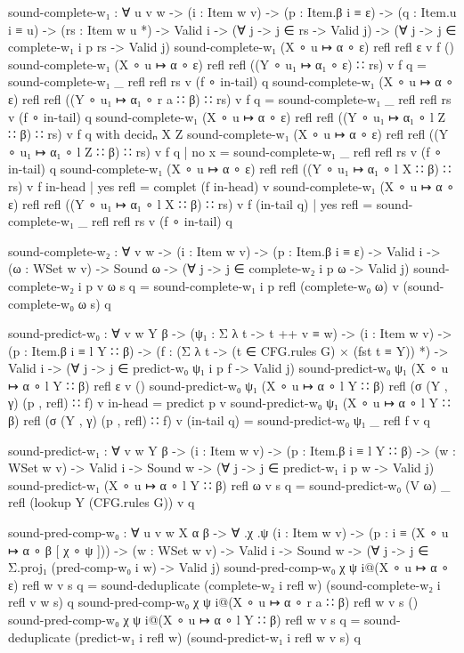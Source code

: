 \begin{code}
			sound-complete-w₁ : ∀ {u v w} ->
			  (i : Item w v) ->
			  (p : Item.β i ≡ ε) ->
			  (q : Item.u i ≡ u) ->
			  (rs : Item w u *) ->
			  Valid i -> (∀ {j} -> j ∈ rs -> Valid j) ->
			  (∀ {j} -> j ∈ complete-w₁ i p rs -> Valid j)
			sound-complete-w₁ (X ∘ u ↦ α ∘ ε) refl refl ε v f ()
			sound-complete-w₁ (X ∘ u ↦ α ∘ ε) refl refl ((Y ∘ u₁ ↦ α₁ ∘ ε) ∷ rs) v f q = sound-complete-w₁ _ refl refl rs v (f ∘ in-tail) q
			sound-complete-w₁ (X ∘ u ↦ α ∘ ε) refl refl ((Y ∘ u₁ ↦ α₁ ∘ r a ∷ β) ∷ rs) v f q = sound-complete-w₁ _ refl refl rs v (f ∘ in-tail) q
			sound-complete-w₁ (X ∘ u ↦ α ∘ ε) refl refl ((Y ∘ u₁ ↦ α₁ ∘ l Z ∷ β) ∷ rs) v f q           with decidₙ X Z
			sound-complete-w₁ (X ∘ u ↦ α ∘ ε) refl refl ((Y ∘ u₁ ↦ α₁ ∘ l Z ∷ β) ∷ rs) v f q           | no x = sound-complete-w₁ _ refl refl rs v (f ∘ in-tail) q
			sound-complete-w₁ (X ∘ u ↦ α ∘ ε) refl refl ((Y ∘ u₁ ↦ α₁ ∘ l X ∷ β) ∷ rs) v f in-head     | yes refl = complet (f in-head) v
			sound-complete-w₁ (X ∘ u ↦ α ∘ ε) refl refl ((Y ∘ u₁ ↦ α₁ ∘ l X ∷ β) ∷ rs) v f (in-tail q) | yes refl = sound-complete-w₁ _ refl refl rs v (f ∘ in-tail) q
			
			sound-complete-w₂ : ∀ {v w} ->
			  (i : Item w v) ->
			  (p : Item.β i ≡ ε) ->
			  Valid i -> (ω : WSet w v) -> Sound ω ->
			  (∀ {j} -> j ∈ complete-w₂ i p ω -> Valid j)
			sound-complete-w₂ i p v ω s q =
			  sound-complete-w₁ i p refl (complete-w₀ ω) v (sound-complete-w₀ ω s) q
			
			sound-predict-w₀ : ∀ {v w  Y β} ->
			  (ψ₁ : Σ λ t -> t ++ v ≡ w) ->
			  (i : Item w v) -> (p : Item.β i ≡ l Y ∷ β) ->
			  (f : (Σ λ t -> (t ∈ CFG.rules G) × (fst t ≡ Y)) *) ->
			  Valid i ->
			  (∀ {j} -> j ∈ predict-w₀ ψ₁ i p f -> Valid j)
			sound-predict-w₀ ψ₁ (X ∘ u ↦ α ∘ l Y ∷ β) refl ε v ()
			sound-predict-w₀ ψ₁ (X ∘ u ↦ α ∘ l Y ∷ β) refl (σ (Y , γ) (p , refl) ∷ f) v in-head = predict p v
			sound-predict-w₀ ψ₁ (X ∘ u ↦ α ∘ l Y ∷ β) refl (σ (Y , γ) (p , refl) ∷ f) v (in-tail q) =
			  sound-predict-w₀ ψ₁ _ refl f v q
			
			sound-predict-w₁ : ∀ {v w Y β} ->
			  (i : Item w v) ->  (p : Item.β i ≡ l Y ∷ β) ->
			  (w : WSet w v) ->
			  Valid i -> Sound w ->
			  (∀ {j} -> j ∈ predict-w₁ i p w -> Valid j)
			sound-predict-w₁ (X ∘ u ↦ α ∘ l Y ∷ β) refl ω v s q =
			  sound-predict-w₀ (V ω) _ refl (lookup Y (CFG.rules G)) v q
			
			sound-pred-comp-w₀ : ∀ {u v w X α β} -> ∀ .χ .ψ
			  (i : Item w v) -> (p : i ≡ (X ∘ u ↦ α ∘ β [ χ ∘ ψ ])) ->
			  (w : WSet w v) ->
			  Valid i -> Sound w ->
			  (∀ {j} -> j ∈ Σ.proj₁ (pred-comp-w₀ i w) -> Valid j)
			sound-pred-comp-w₀ χ ψ i@(X ∘ u ↦ α ∘ ε) refl w v s q =
			  sound-deduplicate (complete-w₂ i refl w) (sound-complete-w₂ i refl v w s) q
			sound-pred-comp-w₀ χ ψ i@(X ∘ u ↦ α ∘ r a ∷ β) refl w v s ()
			sound-pred-comp-w₀ χ ψ i@(X ∘ u ↦ α ∘ l Y ∷ β) refl w v s q =
			  sound-deduplicate (predict-w₁ i refl w) (sound-predict-w₁ i refl w v s) q
			

\end{code}
